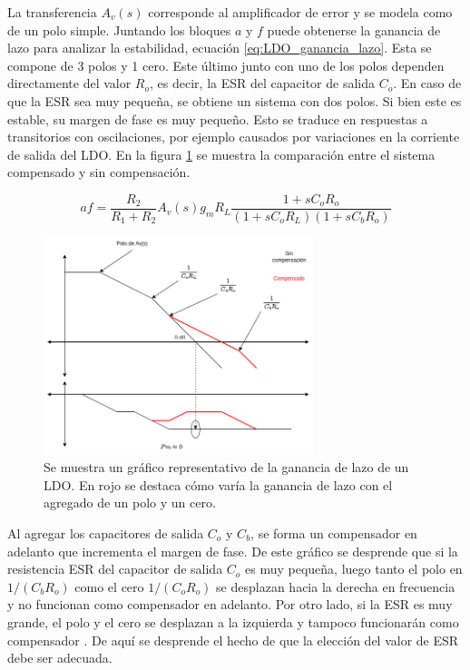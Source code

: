 La transferencia $A_v(s)$ corresponde al amplificador de error y se modela como de un polo simple. Juntando los bloques $a$ y $f$ puede obtenerse la ganancia de lazo para analizar la estabilidad, ecuación \eqref{eq:LDO_ganancia_lazo}. Esta se compone de 3 polos y 1 cero. Este último junto con uno de los polos dependen directamente del valor $R_o$, es decir, la ESR del capacitor de salida $C_o$. En caso de que la ESR sea muy pequeña, se obtiene un sistema con dos polos. Si bien este es estable, su margen de fase es muy pequeño. Esto se traduce en respuestas a transitorios con oscilaciones, por ejemplo causados por variaciones en la corriente de salida del LDO. En la figura \ref{fig:LDO_ganancia_lazo_1} se muestra la comparación entre el sistema compensado y sin compensación.

\begin{equation}
    af = \frac{R_2}{R_1+R_2} A_v(s) g_m  R_L \frac{1 + s C_o R_o}{\left( 1 + s C_o R_L \right) \left( 1 + s C_b R_o \right)}
    \label{eq:LDO_ganancia_lazo}
\end{equation}

\begin{figure}[H]
    \centering
    \includegraphics[width=0.7\textwidth]{img/LDO_ganancia_lazo_1.png}
    \caption{Se muestra un gráfico representativo de la ganancia de lazo de un LDO. En rojo se destaca cómo varía la ganancia de lazo con el agregado de un polo y un cero.}
    \label{fig:LDO_ganancia_lazo_1}    
\end{figure}

Al agregar los capacitores de salida $C_o$ y $C_b$, se forma un compensador en adelanto que incrementa el margen de fase. De este gráfico se desprende que si la resistencia ESR del capacitor de salida $C_o$ es muy pequeña, luego tanto el polo en $1/(C_b R_o)$ como el cero $1/(C_o R_o)$ se desplazan hacia la derecha en frecuencia y no funcionan como compensador en adelanto. Por otro lado, si la ESR es muy grande, el polo y el cero se desplazan a la izquierda y tampoco funcionarán como compensador \cite{SLVA072}. De aquí se desprende el hecho de que la elección del valor de ESR debe ser adecuada.\\


